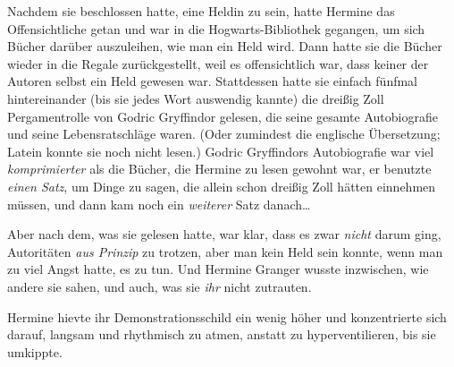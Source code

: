 Nachdem sie beschlossen hatte, eine Heldin zu sein, hatte Hermine das Offensichtliche getan und war in die Hogwarts-Bibliothek gegangen, um sich Bücher darüber auszuleihen, wie man ein Held wird. Dann hatte sie die Bücher wieder in die Regale zurückgestellt, weil es offensichtlich war, dass keiner der Autoren selbst ein Held gewesen war. Stattdessen hatte sie einfach fünfmal hintereinander (bis sie jedes Wort auswendig kannte) die dreißig Zoll Pergamentrolle von Godric Gryffindor gelesen, die seine gesamte Autobiografie und seine Lebensratschläge waren. (Oder zumindest die englische Übersetzung; Latein konnte sie noch nicht lesen.) Godric Gryffindors Autobiografie war viel \emph{komprimierter} als die Bücher, die Hermine zu lesen gewohnt war, er benutzte \emph{einen Satz}, um Dinge zu sagen, die allein schon dreißig Zoll hätten einnehmen müssen, und dann kam noch ein \emph{weiterer} Satz danach…

Aber nach dem, was sie gelesen hatte, war klar, dass es zwar \emph{nicht} darum ging, Autoritäten \emph{aus Prinzip} zu trotzen, aber man kein Held sein konnte, wenn man zu viel Angst hatte, es zu tun. Und Hermine Granger wusste inzwischen, wie andere sie sahen, und auch, was sie \emph{ihr} nicht zutrauten.

Hermine hievte ihr Demonstrationsschild ein wenig höher und konzentrierte sich darauf, langsam und rhythmisch zu atmen, anstatt zu hyperventilieren, bis sie umkippte.

